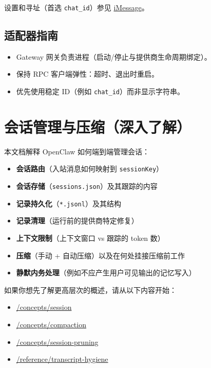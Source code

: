 设置和寻址（首选 \texttt{chat\_id}）参见 \href{/channels/imessage}{iMessage}。

\subsection{适配器指南}


\begin{itemize}
  \item Gateway 网关负责进程（启动/停止与提供商生命周期绑定）。
  \item 保持 RPC 客户端弹性：超时、退出时重启。
  \item 优先使用稳定 ID（例如 \texttt{chat\_id}）而非显示字符串。
\end{itemize}



\clearpage

\section{会话管理与压缩（深入了解）}


本文档解释 OpenClaw 如何端到端管理会话：

\begin{itemize}
  \item \textbf{会话路由}（入站消息如何映射到 \texttt{sessionKey}）
  \item \textbf{会话存储}（\texttt{sessions.json}）及其跟踪的内容
  \item \textbf{记录持久化}（\texttt{*.jsonl}）及其结构
  \item \textbf{记录清理}（运行前的提供商特定修复）
  \item \textbf{上下文限制}（上下文窗口 vs 跟踪的 token 数）
  \item \textbf{压缩}（手动 + 自动压缩）以及在何处挂接压缩前工作
  \item \textbf{静默内务处理}（例如不应产生用户可见输出的记忆写入）
\end{itemize}


如果你想先了解更高层次的概述，请从以下内容开始：

\begin{itemize}
  \item \href{/concepts/session}{/concepts/session}
  \item \href{/concepts/compaction}{/concepts/compaction}
  \item \href{/concepts/session-pruning}{/concepts/session-pruning}
  \item \href{/reference/transcript-hygiene}{/reference/transcript-hygiene}
\end{itemize}


